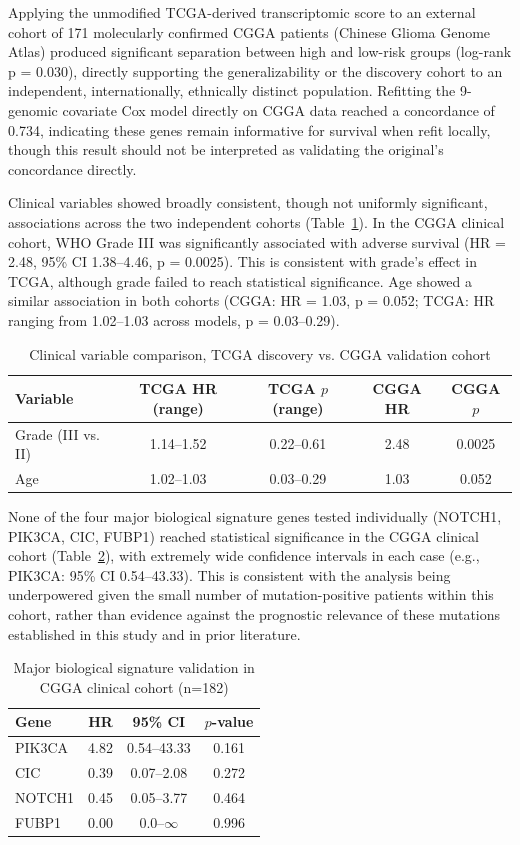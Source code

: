 \documentclass[11pt, letterpaper]{article}
\begin{document}
Applying the unmodified TCGA-derived transcriptomic score to an external cohort of 171 molecularly confirmed CGGA patients (Chinese Glioma Genome Atlas) produced significant separation between high and low-risk groups (log-rank p = 0.030), directly supporting the generalizability or the discovery cohort to an independent, internationally, ethnically distinct population. Refitting the 9-genomic covariate Cox model directly on CGGA data reached a concordance of 0.734, indicating these genes remain informative for survival when refit locally, though this result should not be interpreted as validating the original's concordance directly.

Clinical variables showed broadly consistent, though not uniformly significant, associations across the two independent cohorts (Table~\ref{tab:cgga-clinical}). In the CGGA clinical cohort, WHO Grade III was significantly associated with adverse survival (HR = 2.48, 95\% CI 1.38--4.46, p = 0.0025). This is consistent with grade's effect in TCGA, although grade failed to reach statistical significance. Age showed a similar association in both cohorts (CGGA: HR = 1.03, p = 0.052; TCGA: HR ranging from 1.02--1.03 across models, p = 0.03--0.29). 

\begin{table}[H]
\centering
\caption{Clinical variable comparison, TCGA discovery vs. CGGA validation cohort}
\label{tab:cgga-clinical}
\begin{tabular}{lcccc}
\toprule
Variable & TCGA HR (range) & TCGA $p$ (range) & CGGA HR & CGGA $p$ \\
\midrule
Grade (III vs. II) & 1.14--1.52 & 0.22--0.61 & 2.48 & 0.0025 \\
Age & 1.02--1.03 & 0.03--0.29 & 1.03 & 0.052 \\
\bottomrule
\end{tabular}
\end{table}

None of the four major biological signature genes tested individually (NOTCH1, PIK3CA, CIC, FUBP1) reached statistical significance in the CGGA clinical cohort (Table~\ref{tab:cgga-mutations}), with extremely wide confidence intervals in each case (e.g., PIK3CA: 95\% CI 0.54--43.33). This is consistent with the analysis being underpowered given the small number of mutation-positive patients within this cohort, rather than evidence against the prognostic relevance of these mutations established in this study and in prior literature.

\begin{table}[h!]
\centering
\caption{Major biological signature validation in CGGA clinical cohort (n=182)}
\label{tab:cgga-mutations}
\begin{tabular}{lccc}
\toprule
Gene & HR & 95\% CI & $p$-value \\
\midrule
PIK3CA & 4.82 & 0.54--43.33 & 0.161 \\
CIC & 0.39 & 0.07--2.08 & 0.272 \\
NOTCH1 & 0.45 & 0.05--3.77 & 0.464 \\
FUBP1 & 0.00 & 0.0--$\infty$ & 0.996 \\
\bottomrule
\end{tabular}
\end{table}
\end{document}
